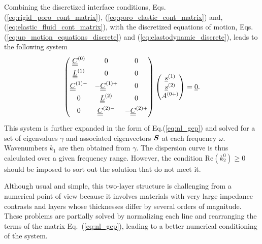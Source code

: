 Combining the discretized interface conditions, Eqs.(\ref{eq:rigid_poro_cont_matrix}), (\ref{eq:poro_elastic_cont_matrix}) and, (\ref{eq:elastic_fluid_cont_matrix}), with the discretized equations of motion, Eqs.(\ref{eq:up_motion_equations_discrete}) and (\ref{eq:elastodynamic_discrete}), leads to the following system
    \begin{equation}
        \begin{pmatrix}
            \underline{\underline{C}}^{(0)} & 0 & 0 \\[1ex]
            \underline{\underline{L}}^{(1)} & 0 & 0 \\[1ex]
            \underline{\underline{C}}^{(1)-} & -\underline{\underline{C}}^{(1)+} & 0 \\[1ex]
            0 & \underline{\underline{L}}^{(2)}  & 0 \\[1ex]
            0 & \underline{\underline{C}}^{(2)-} & -\underline{\underline{C}}^{(2)+} \\[1ex]
        \end{pmatrix}
        \begin{pmatrix}
                \underline{s}^{(1)} \\ \underline{s}^{(2)} \\ A^{(0+)} 
        \end{pmatrix} = \underline{0}.
    \end{equation}
This system is further expanded in the form of Eq.(\ref{eq:nl_gep}) and solved for a set of eigenvalues $\gamma$ and associated eigenvectors $\boldsymbol S$ at each frequency $\omega$. Wavenumbers $ k_1$ are then obtained from $\gamma$. The dispersion curve is thus calculated over a given frequency range. However, the condition $\textrm{Re}\left(k_2^{0}\right)\geq0$ should be imposed to sort out the solution that do not meet it.

Although usual and simple, this two-layer structure is challenging from a numerical point of view because it involves materials with very large impedance contrasts and layers whose thicknesses differ by several orders of magnitude. These problems are partially solved by normalizing each line and rearranging the terms of the matrix Eq.~(\ref{eq:nl_gep}), leading to a better numerical conditioning of the system. 
    
